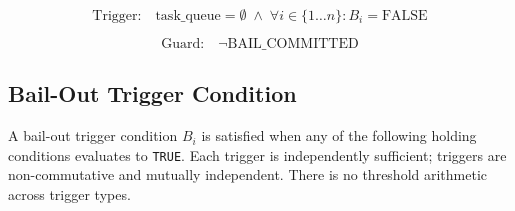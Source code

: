 \[
\text{Trigger:} \quad \text{task\_queue} = \emptyset \;\land\; \forall i \in \{1 \ldots n\}: B_i = \text{FALSE}
\]

\[
\text{Guard:} \quad \neg\text{BAIL\_COMMITTED}
\]

\bigskip

\subsection{Bail-Out Trigger Condition}
\label{sec:triggers}

A bail-out trigger condition $B_i$ is satisfied when any of the following holding conditions evaluates to \texttt{TRUE}. Each trigger is independently sufficient; triggers are non-commutative and mutually independent. There is no threshold arithmetic across trigger types.

\bigskip

